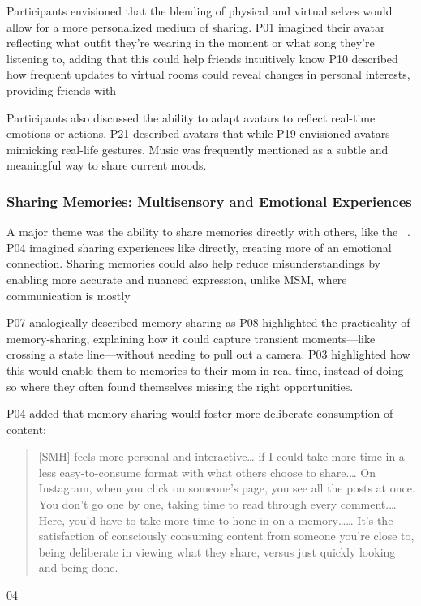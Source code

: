 Participants envisioned that the blending of physical and virtual selves would allow for a more personalized medium of sharing. P01 imagined their avatar reflecting what outfit they're wearing in the moment or what song they're listening to, adding that this could help friends intuitively know  P10 described how frequent updates to virtual rooms could reveal changes in personal interests, providing friends with 

Participants also discussed the ability to adapt avatars to reflect real-time emotions or actions. P21 described avatars that  while P19 envisioned avatars mimicking real-life gestures. Music was frequently mentioned as a subtle and meaningful way to share current moods.


\subsubsection{Sharing Memories: Multisensory and Emotional Experiences}
\label{lab:4-3-3}
A major theme was the ability to share memories directly with others, like the ~\cite{pensieve}. P04 imagined sharing experiences like  directly, creating more of an emotional connection. Sharing memories could also help reduce misunderstandings by enabling more accurate and nuanced expression, unlike MSM, where communication is mostly  

P07 analogically described memory-sharing as  P08 highlighted the practicality of memory-sharing, explaining how it could capture transient moments---like crossing a state line---without needing to pull out a camera. P03 highlighted how this would enable them to  memories to their mom in real-time, instead of doing so  where they often found themselves missing the right opportunities.

P04 added that memory-sharing would foster more deliberate consumption of content: \blockquote{[SMH] feels more personal and interactive\ldots{} if I could take more time in a less easy-to-consume format with what others choose to share.\ldots{} On Instagram, when you click on someone's page, you see all the posts at once. You don't go one by one, taking time to read through every comment.\ldots{} Here, you'd have to take more time to hone in on a memory\ldots{}\ldots{} It's the satisfaction of consciously consuming content from someone you're close to, being deliberate in viewing what they share, versus just quickly looking and being done.}{04}

